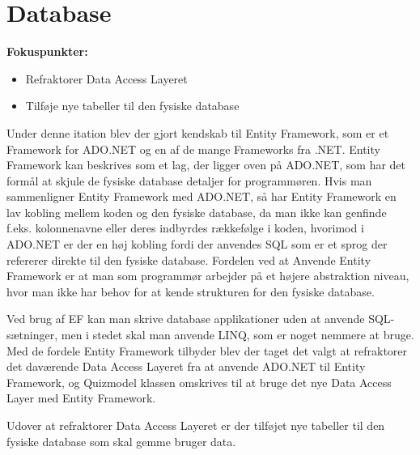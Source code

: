 \section{Database}

\textbf{Fokuspunkter:}
	\begin{itemize}
			\item Refraktorer Data Access Layeret 
			\item Tilføje nye tabeller til den fysiske database
	\end{itemize}


Under denne itation blev der gjort kendskab til Entity Framework, som er et Framework for ADO.NET og en af de mange Frameworks fra .NET. Entity Framework kan beskrives som et lag, der ligger oven på ADO.NET, som har det formål at skjule de fysiske database detaljer for programmøren. Hvis man sammenligner Entity Framework med ADO.NET, så har Entity Framework en lav kobling mellem koden og den fysiske database, da man ikke kan genfinde f.eks. kolonnenavne eller deres indbyrdes rækkefølge i koden, hvorimod i ADO.NET er der en høj kobling fordi der anvendes SQL som er et sprog der refererer direkte til den fysiske database. Fordelen ved at Anvende Entity Framework er at man som programmør arbejder på et højere abstraktion niveau, hvor man ikke har behov for at kende strukturen for den fysiske database. 

Ved brug af EF kan man skrive database applikationer uden at anvende SQL-sætninger, men i stedet skal man anvende LINQ, som er noget nemmere at bruge. Med de fordele Entity Framework tilbyder blev der taget det valgt at refraktorer det daværende Data Access Layeret fra at anvende ADO.NET til Entity Framework, og Quizmodel klassen omskrives til at bruge det nye Data Access Layer med Entity Framework. 

Udover at refraktorer Data Access Layeret er der tilføjet nye tabeller til den fysiske database som skal gemme bruger data. 

